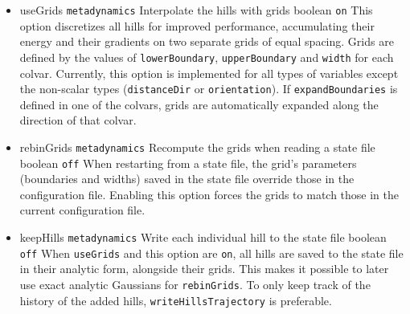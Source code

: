 \begin{itemize}

\item %
  \keydef
    {useGrids}{%
    \texttt{metadynamics}}{%
    Interpolate the hills with grids}{%
    boolean}{%
    \texttt{on}}{%
    This option discretizes all hills for improved performance,
    accumulating their energy and their gradients on two separate grids
    of equal spacing.  Grids are defined by the values of
    \texttt{lowerBoundary}, \texttt{upperBoundary} and \texttt{width}
    for each colvar.  Currently, this option is implemented for all
    types of variables except the non-scalar types (\texttt{distanceDir}
    or \texttt{orientation}).  If \texttt{expandBoundaries} is defined
    in one of the colvars, grids are automatically expanded along the
    direction of that colvar.}

\item %
  \keydef
    {rebinGrids}{%
    \texttt{metadynamics}}{%
    Recompute the grids when reading a state
    file}{%
    boolean}{%
    \texttt{off}}{%
    When restarting from a state file, the grid's parameters (boundaries
    and widths) saved in the state file override those in the
    configuration file.  Enabling this option forces the grids to match
    those in the current configuration file.}

\item %
  \keydef
    {keepHills}{%
    \texttt{metadynamics}}{%
    Write each individual hill to the state
    file}{%
    boolean}{%
    \texttt{off}}{%
    When \texttt{useGrids} and this option are \texttt{on}, all hills
    are saved to the state file in their analytic form, alongside their
    grids.  This makes it possible to later use exact analytic Gaussians
    for \texttt{rebinGrids}.  To only keep track of the history of the
    added hills, \texttt{writeHillsTrajectory} is preferable.}

\end{itemize}



